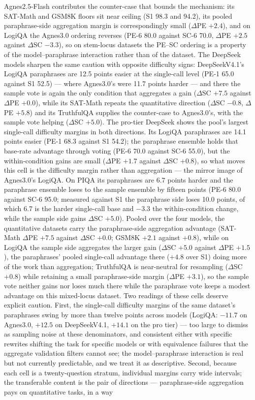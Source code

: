 Agnes2.5-Flash contributes the counter-case that bounds the mechanism: its SAT-Math and GSM8K floors sit near ceiling (S1 98.3 and 94.2), its pooled paraphrase-side aggregation margin is correspondingly small ($\Delta$PE $+2.4$), and on LogiQA the Agnes3.0 ordering reverses (PE-6 80.0 against SC-6 70.0, $\Delta$PE $+2.5$ against $\Delta$SC $-3.3$), so on stem-locus datasets the PE--SC ordering is a property of the model--paraphrase interaction rather than of the dataset. The DeepSeek models sharpen the same caution with opposite difficulty signs: DeepSeekV4.1's LogiQA paraphrases are 12.5 points easier at the single-call level (PE-1 65.0 against S1 52.5) --- where Agnes3.0's were 11.7 points harder --- and there the sample vote is again the only condition that aggregates a gain ($\Delta$SC $+7.5$ against $\Delta$PE $+0.0$), while its SAT-Math repeats the quantitative direction ($\Delta$SC $-0.8$, $\Delta$PE $+5.8$) and its TruthfulQA supplies the counter-case to Agnes3.0's, with the sample vote helping ($\Delta$SC $+5.0$). The pro-tier DeepSeek shows the pool's largest single-call difficulty margins in both directions. Its LogiQA paraphrases are 14.1 points easier (PE-1 68.3 against S1 54.2); the paraphrase ensemble holds that base-rate advantage through voting (PE-6 70.0 against SC-6 55.0), but the within-condition gains are small ($\Delta$PE $+1.7$ against $\Delta$SC $+0.8$), so what moves this cell is the difficulty margin rather than aggregation --- the mirror image of Agnes3.0's LogiQA. On PIQA its paraphrases are 6.7 points harder and the paraphrase ensemble loses to the sample ensemble by fifteen points (PE-6 80.0 against SC-6 95.0; measured against S1 the paraphrase side loses 10.0 points, of which 6.7 is the harder single-call base and $-3.3$ the within-condition change, while the sample side gains $\Delta$SC $+5.0$). Pooled over the four models, the quantitative datasets carry the paraphrase-side aggregation advantage (SAT-Math $\Delta$PE $+7.5$ against $\Delta$SC $+0.0$; GSM8K $+2.1$ against $+0.8$), while on LogiQA the sample side aggregates the larger gain ($\Delta$SC $+5.0$ against $\Delta$PE $+1.5$), the paraphrases' pooled single-call advantage there ($+4.8$ over S1) doing more of the work than aggregation; TruthfulQA is near-neutral for resampling ($\Delta$SC $+0.8$) while retaining a small paraphrase-side margin ($\Delta$PE $+3.1$), so the sample vote neither gains nor loses much there while the paraphrase vote keeps a modest advantage on this mixed-locus dataset. Two readings of these cells deserve explicit caution. First, the single-call difficulty margins of the same dataset's paraphrases swing by more than twelve points across models (LogiQA: $-11.7$ on Agnes3.0, $+12.5$ on DeepSeekV4.1, $+14.1$ on the pro tier) --- too large to dismiss as sampling noise at these denominators, and consistent either with specific rewrites shifting the task for specific models or with equivalence failures that the aggregate validation filters cannot see; the model--paraphrase interaction is real but not currently predictable, and we treat it as descriptive. Second, because each cell is a twenty-question stratum, individual margins carry wide intervals; the transferable content is the pair of directions --- paraphrase-side aggregation pays on quantitative tasks, in a way 